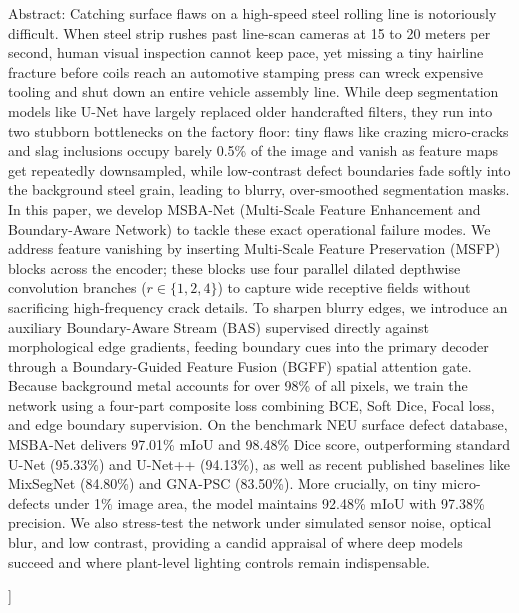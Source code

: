 \documentclass[10pt,a4paper]{article}
\begin{document}
{  \noindent
  \hangindent=2.0cm
  {\fontsize{9pt}{11pt}\selectfont
  Abstract: Catching surface flaws on a high-speed steel rolling line is notoriously difficult. When steel strip rushes past line-scan cameras at 15 to 20 meters per second, human visual inspection cannot keep pace, yet missing a tiny hairline fracture before coils reach an automotive stamping press can wreck expensive tooling and shut down an entire vehicle assembly line. While deep segmentation models like U-Net have largely replaced older handcrafted filters, they run into two stubborn bottlenecks on the factory floor: tiny flaws like crazing micro-cracks and slag inclusions occupy barely 0.5\% of the image and vanish as feature maps get repeatedly downsampled, while low-contrast defect boundaries fade softly into the background steel grain, leading to blurry, over-smoothed segmentation masks. In this paper, we develop MSBA-Net (Multi-Scale Feature Enhancement and Boundary-Aware Network) to tackle these exact operational failure modes. We address feature vanishing by inserting Multi-Scale Feature Preservation (MSFP) blocks across the encoder; these blocks use four parallel dilated depthwise convolution branches ($r \in \{1, 2, 4\}$) to capture wide receptive fields without sacrificing high-frequency crack details. To sharpen blurry edges, we introduce an auxiliary Boundary-Aware Stream (BAS) supervised directly against morphological edge gradients, feeding boundary cues into the primary decoder through a Boundary-Guided Feature Fusion (BGFF) spatial attention gate. Because background metal accounts for over 98\% of all pixels, we train the network using a four-part composite loss combining BCE, Soft Dice, Focal loss, and edge boundary supervision. On the benchmark NEU surface defect database, MSBA-Net delivers 97.01\% mIoU and 98.48\% Dice score, outperforming standard U-Net (95.33\%) and U-Net++ (94.13\%), as well as recent published baselines like MixSegNet (84.80\%) and GNA-PSC (83.50\%). More crucially, on tiny micro-defects under 1\% image area, the model maintains 92.48\% mIoU with 97.38\% precision. We also stress-test the network under simulated sensor noise, optical blur, and low contrast, providing a candid appraisal of where deep models succeed and where plant-level lighting controls remain indispensable.
  \par}
  \vspace{16pt}
}]
\end{document}
